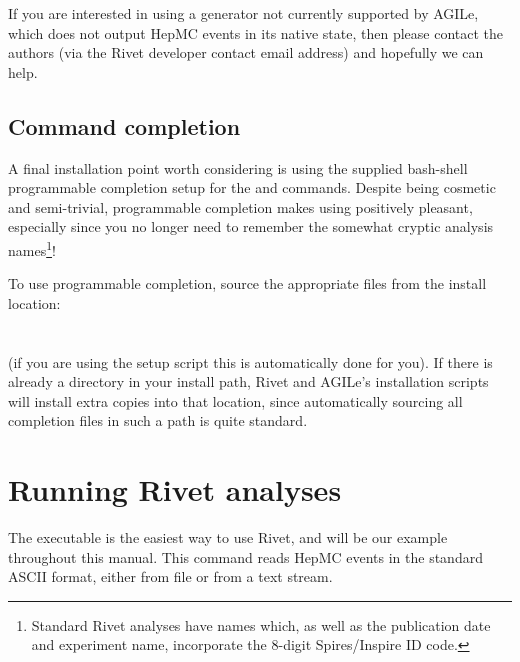 If you are interested in using a generator not currently supported by AGILe,
which does not output HepMC events in its native state, then please contact the
authors (via the Rivet developer contact email address) and hopefully we can
help.


\subsection{Command completion}

A final installation point worth considering is using the supplied bash-shell
programmable completion setup for the  and 
commands. Despite being cosmetic and semi-trivial, programmable completion makes
using  positively pleasant, especially since you no longer need to
remember the somewhat cryptic analysis names\footnote{Standard Rivet analyses
  have names which, as well as the publication date and experiment name,
  incorporate the 8-digit Spires/Inspire ID code.}!

To use programmable completion, source the appropriate files from the install
location:\\
\\
\\
(if you are using the setup script  this is automatically
done for you).
If there is already a  directory in
your install path, Rivet and AGILe's installation scripts will install extra
copies into that location, since automatically sourcing all completion files in
such a path is quite standard.




\section{Running Rivet analyses}
\label{sec:agile-runmc}

The  executable is the easiest way to use Rivet, and will be our
example throughout this manual. This command reads HepMC events in the standard
ASCII format, either from file or from a text stream.

